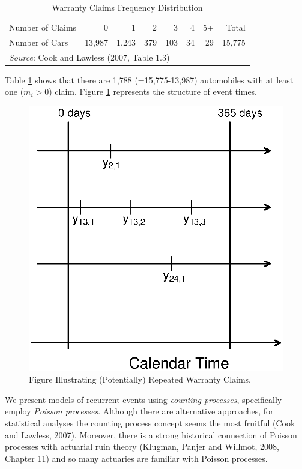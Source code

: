 \begin{table}[h]
 \caption{\label{T14:WarrantyClaims} Warranty Claims
Frequency Distribution}
\begin{tabular}{lrrrrrrr}
\hline Number  of Claims & 0 &  1 & 2 & 3 & 4 & 5+ & Total \\
Number  of Cars & 13,987 & 1,243 &  379 & 103 & 34 & 29 & 15,775
\\
\hline \multicolumn{7}{l}{{\emph{Source}}: Cook and Lawless (2007,
Table 1.3)}
\\
\end{tabular}
\end{table}

Table \ref{T14:WarrantyClaims} shows that there are 1,788
(=15,775-13,987) automobiles with at least one ($m_i > 0$) claim.
Figure \ref{F14:Warranty} represents the structure of event times.


\begin{figure}[htp]
  \begin{center}
    \includegraphics[width=.6\textwidth]{Chapter14Survival/F14Warranty.eps}
    \caption{\label{F14:Warranty}\small Figure Illustrating (Potentially) Repeated Warranty Claims.}
  \end{center}
\end{figure}

\linejed

We present models of recurrent events using \emph{counting
processes}, specifically employ \emph{Poisson processes}. Although
there are alternative approaches, for statistical analyses the
counting process concept seems the most fruitful (Cook and Lawless,
2007). Moreover, there is a strong historical connection of Poisson
processes with actuarial ruin theory (Klugman, Panjer and Willmot,
2008, Chapter 11) and so many actuaries are familiar with Poisson
processes.

